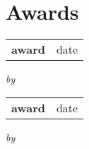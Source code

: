 \section{\sc Awards}

\begin{tabular}{@{}p{4.5in}p{2in}}
  {\bf{award }}  & date \\
\end{tabular}  
\textit{by}  

\begin{tabular}{@{}p{4.5in}p{2in}}
  {\bf{award }}  & date \\
\end{tabular}  
\textit{by}  
\endinput
